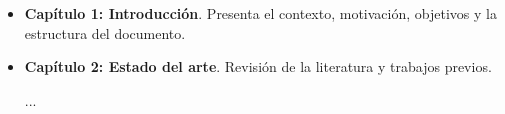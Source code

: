 \begin{itemize}
    \item \textbf{Capítulo 1: Introducción}. Presenta el contexto, motivación, objetivos y la estructura del documento.
    
    \item \textbf{Capítulo 2: Estado del arte}. Revisión de la literatura y trabajos previos.

    ...
    
    
    
    
\end{itemize}
